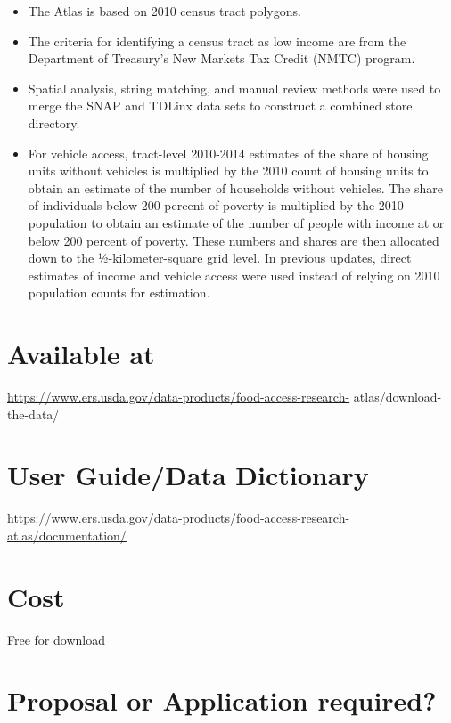 \documentclass[
]{book}
\providecommand{\tightlist}{%
  \setlength{\itemsep}{0pt}\setlength{\parskip}{0pt}}
\begin{document}
\begin{itemize}
\tightlist
\item
  The Atlas is based on 2010 census tract polygons.
\item
  The criteria for identifying a census tract as low income are from the Department of Treasury's New Markets Tax Credit (NMTC) program.
\item
  Spatial analysis, string matching, and manual review methods were used to merge the SNAP and TDLinx data sets to construct a combined store directory.
\item
  For vehicle access, tract-level 2010-2014 estimates of the share of housing units without vehicles is multiplied by the 2010 count of housing units to obtain an estimate of the number of households without vehicles. The share of individuals below 200 percent of poverty is multiplied by the 2010 population to obtain an estimate of the number of people with income at or below 200 percent of poverty. These numbers and shares are then allocated down to the ½-kilometer-square grid level. In previous updates, direct estimates of income and vehicle access were used instead of relying on 2010 population counts for estimation.
\end{itemize}

\hypertarget{available-at-26}{%
\section{Available at}\label{available-at-26}}

\url{https://www.ers.usda.gov/data-products/food-access-research-} atlas/download-the-data/

\hypertarget{user-guidedata-dictionary-26}{%
\section{User Guide/Data Dictionary}\label{user-guidedata-dictionary-26}}

\url{https://www.ers.usda.gov/data-products/food-access-research-atlas/documentation/}

\hypertarget{cost-26}{%
\section{Cost}\label{cost-26}}

Free for download

\hypertarget{proposal-or-application-required-26}{%
\section{Proposal or Application required?}\label{proposal-or-application-required-26}}
\end{document}

